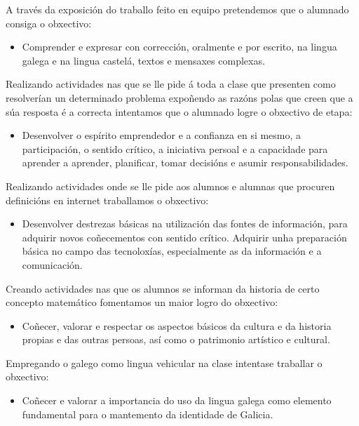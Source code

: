 A través da exposición do traballo feito en equipo pretendemos que o alumnado consiga o obxectivo:

\begin{itemize}
    \item Comprender e expresar con corrección, oralmente e por escrito, na lingua galega e na lingua castelá, textos e mensaxes complexas.
\end{itemize}

Realizando actividades nas que se lle pide á toda a clase que presenten como resolverían un determinado problema expoñendo as razóns polas que creen que a súa resposta é a correcta intentamos que o alumnado logre o obxectivo de etapa:
\begin{itemize}
    \item Desenvolver o espírito emprendedor e a confianza en si mesmo, a participación, o sentido crítico, a iniciativa persoal e a capacidade para aprender a aprender, planificar, tomar decisións e asumir responsabilidades.
\end{itemize}

Realizando actividades onde se lle pide aos alumnos e alumnas que procuren definicións en internet traballamos o obxectivo:
\begin{itemize}
    \item Desenvolver destrezas básicas na utilización das fontes de información, para adquirir novos coñecementos con sentido crítico. Adquirir unha preparación básica no campo das tecnoloxías, especialmente as da información e a comunicación.
\end{itemize}

Creando actividades nas que os alumnos se informan da historia de certo concepto matemático fomentamos un maior logro do obxectivo:

\begin{itemize}
    \item Coñecer, valorar e respectar os aspectos básicos da cultura e da historia propias e das outras persoas, así como o patrimonio artístico e cultural.
\end{itemize}

Empregando o galego como lingua vehicular na clase intentase traballar o obxectivo:

\begin{itemize}
    \item Coñecer e valorar a importancia do uso da lingua galega como elemento fundamental para o mantemento da identidade de Galicia.
\end{itemize}
